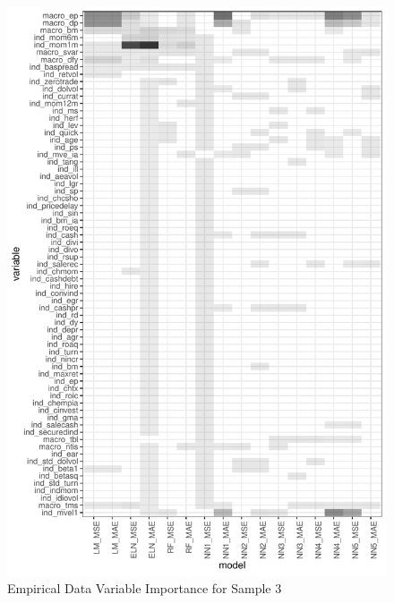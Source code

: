 \documentclass[a4paper, table]{article}
\begin{document}
\begin{figure}
	\includegraphics{empirical_sample_3_vi.pdf}
	\caption{Empirical Data Variable Importance for Sample 3}
\end{figure}
\end{document}
